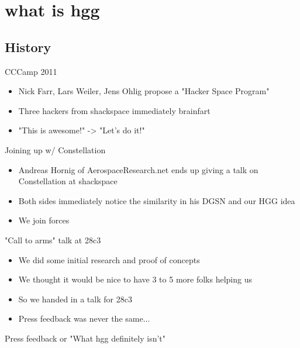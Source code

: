 
\newlength{\smallcol}
\setlength{\smallcol}{0.333333333333\textwidth}

\newlength{\bigcol}
\setlength{\bigcol}{\textwidth}
\addtolength{\bigcol}{- \smallcol}


\begin{frame}[plain]
\end{frame}

\section{what is hgg}

\subsection{History}
	\begin{frame}{CCCamp 2011}
		\begin{itemize}
			\item Nick Farr, Lars Weiler, Jens Ohlig propose a "Hacker Space Program"
			\item Three hackers from shackspace immediately brainfart
			\item "This is awesome!" -> "Let's do it!"
		\end{itemize}
	\end{frame}
	\begin{frame}{Joining up w/ Constellation}
		\begin{itemize}
			\item Andreas Hornig of AerospaceResearch.net ends up giving a talk on Constellation at shackspace
			\item Both sides immediately notice the similarity in his DGSN and our HGG idea
			\item We join forces
		\end{itemize}
	\end{frame}
	\begin{frame}{"Call to arms" talk at 28c3}
		\begin{itemize}
			\item We did some initial research and proof of concepts
			\item We thought it would be nice to have 3 to 5 more folks helping us
			\item So we handed in a talk for 28c3
			\item Press feedback was never the same...
		\end{itemize}
	\end{frame}
	\begin{frame}{Press feedback or "What hgg definitely isn't"}
	\end{frame}

